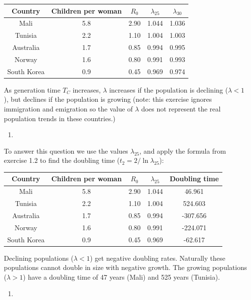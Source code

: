 \documentclass[
]{book}
\providecommand{\tightlist}{%
  \setlength{\itemsep}{0pt}\setlength{\parskip}{0pt}}
\begin{document}
\begin{tabular}{ccccc}
\toprule
Country & Children per woman & $R_0$ & $\lambda_{25}$ & $\lambda_{30}$\\
\midrule
Mali & 5.8 & 2.90 & 1.044 & 1.036\\
Tunisia & 2.2 & 1.10 & 1.004 & 1.003\\
Australia & 1.7 & 0.85 & 0.994 & 0.995\\
Norway & 1.6 & 0.80 & 0.991 & 0.993\\
South Korea & 0.9 & 0.45 & 0.969 & 0.974\\
\bottomrule
\end{tabular}

As generation time \(T_C\) increases, \(\lambda\) increases if the population is declining (\(\lambda<1\)), but declines if the population is growing (note: this exercise ignores immigration and emigration so the value of \(\lambda\) does not represent the real population trends in these countries.)

\begin{enumerate}
\def\labelenumi{\arabic{enumi}.}
\setcounter{enumi}{1}
\tightlist
\item
\end{enumerate}

To answer this question we use the values \(\lambda_{25}\), and apply the formula from exercise 1.2 to find the doubling time (\(t_{2}=2/\ln \lambda_{25}\)):

\begin{tabular}{ccccc}
\toprule
Country & Children per woman & $R_0$ & $\lambda_{25}$ & Doubling time\\
\midrule
Mali & 5.8 & 2.90 & 1.044 & 46.961\\
Tunisia & 2.2 & 1.10 & 1.004 & 524.603\\
Australia & 1.7 & 0.85 & 0.994 & -307.656\\
Norway & 1.6 & 0.80 & 0.991 & -224.071\\
South Korea & 0.9 & 0.45 & 0.969 & -62.617\\
\bottomrule
\end{tabular}

Declining populations (\(\lambda<1\)) get negative doubling rates. Naturally these populations cannot double in size with negative growth. The growing populations (\(\lambda>1\)) have a doubling time of 47 years (Mali) and 525 years (Tunisia).

\begin{enumerate}
\def\labelenumi{\arabic{enumi}.}
\setcounter{enumi}{2}
\tightlist
\item
\end{enumerate}
\end{document}
